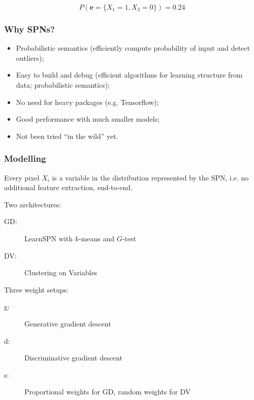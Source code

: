 \documentclass{beamer}
\begin{document}
\begin{frame}
\begin{center}
  \end{center}
  \begin{equation*}
    P(\mathbf{e}=\{X_1=1,X_2=0\})=0.24
  \end{equation*}
\end{frame}

\begin{frame}
  \frametitle{Why SPNs?}

  \begin{itemize}
    \item Probabilistic semantics (efficiently compute probability of input and detect outliers);
    \item Easy to build and debug (efficient algorithms for learning structure from data;
      probabilistic semantics);
    \item No need for heavy packages (e.g. Tensorflow);
    \item Good performance with much smaller models;
    \item Not been tried ``in the wild'' yet.
  \end{itemize}
\end{frame}

\begin{frame}
  \frametitle{Modelling}

  Every pixel $X_i$ is a variable in the distribution represented by the SPN, i.e. no additional
  feature extraction, end-to-end.

  Two architectures:
  \begin{description}
    \item[GD:] LearnSPN with $k$-means and $G$-test
    \item[DV:] Clustering on Variables
  \end{description}
  Three weight setups:
  \begin{description}
    \item[g:] Generative gradient descent
    \item[d:] Discriminative gradient descent
    \item[s:] Proportional weights for GD, random weights for DV
  \end{description}
\end{frame}
\end{document}
